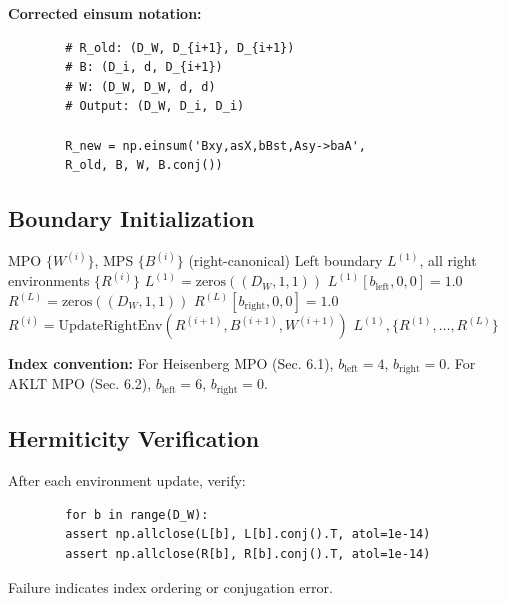 \documentclass[aps,prb,onecolumn,scriptaddress]{revtex4-2}
\begin{document}
	\textbf{Corrected einsum notation:}
	\begin{verbatim}
		# R_old: (D_W, D_{i+1}, D_{i+1})
		# B: (D_i, d, D_{i+1})
		# W: (D_W, D_W, d, d)
		# Output: (D_W, D_i, D_i)
		
		R_new = np.einsum('Bxy,asX,bBst,Asy->baA',
		R_old, B, W, B.conj())
	\end{verbatim}
	
	\subsection{Boundary Initialization}
	
	\begin{algorithm}[H]
		\caption{InitializeEnvironments}
		\begin{algorithmic}[1]
			\Require MPO $\{W^{(i)}\}$, MPS $\{B^{(i)}\}$ (right-canonical)
			\Ensure Left boundary $L^{(1)}$, all right environments $\{R^{(i)}\}$
			\State {}
			\State $L^{(1)} = \text{zeros}((D_W, 1, 1))$
			\State $L^{(1)}[b_{\text{left}}, 0, 0] = 1.0$ 
			\State {}
			\State $R^{(L)} = \text{zeros}((D_W, 1, 1))$
			\State $R^{(L)}[b_{\text{right}}, 0, 0] = 1.0$ 
			\State {}
			\State $R^{(i)} = \text{UpdateRightEnv}(R^{(i+1)}, B^{(i+1)}, W^{(i+1)})$
			\EndFor
			\State \Return $L^{(1)}, \{R^{(1)}, \ldots, R^{(L)}\}$
		\end{algorithmic}
	\end{algorithm}
	
	\textbf{Index convention:} For Heisenberg MPO (Sec. 6.1), $b_{\text{left}} = 4$, $b_{\text{right}} = 0$. For AKLT MPO (Sec. 6.2), $b_{\text{left}} = 6$, $b_{\text{right}} = 0$.
	
	\subsection{Hermiticity Verification}
	
	After each environment update, verify:
	\begin{verbatim}
		for b in range(D_W):
		assert np.allclose(L[b], L[b].conj().T, atol=1e-14)
		assert np.allclose(R[b], R[b].conj().T, atol=1e-14)
	\end{verbatim}
	
	Failure indicates index ordering or conjugation error.
	
\end{document}
